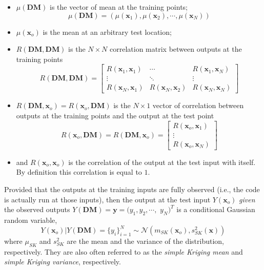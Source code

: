 \begin{itemize}
	\item $\mu(\mathbf{DM})$ is the vector of mean at the training points;
		\begin{equation}
			\mu(\mathbf{DM}) = (\mu(\mathbf{x}_1), \mu(\mathbf{x}_2), \cdots, \mu(\mathbf{x}_N)) 
		\label{eq:training_mean_vector}
		\end{equation}
	\item $\mu(\mathbf{x}_o)$ is the mean at an arbitrary test location;
	\item $R(\mathbf{DM}, \mathbf{DM})$ is the $N \times N$ correlation matrix between outputs at the training points
		\begin{equation}
			R(\mathbf{DM}, \mathbf{DM}) = 
				\begin{bmatrix}
					R(\mathbf{x}_1, \mathbf{x}_1) & \cdots												& R(\mathbf{x}_1, \mathbf{x}_N) \\
					\vdots												& \ddots												&	\vdots \\
					R(\mathbf{x}_N, \mathbf{x}_1)	&	R(\mathbf{x}_N, \mathbf{x}_2) & R(\mathbf{x}_N, \mathbf{x}_N)
				\end{bmatrix}
		\label{eq:training_correlation_matrix}
		\end{equation}
	\item $R(\mathbf{DM}, \mathbf{x}_o) = R(\mathbf{x}_o, \mathbf{DM})$ is the $N \times 1$ vector of correlation between outputs at the training points and the output at the test point
			\begin{equation}
				R(\mathbf{x}_o, \mathbf{DM}) = R(\mathbf{DM}, \mathbf{x}_o) =  
					\begin{bmatrix}
						R(\mathbf{x}_o, \mathbf{x}_1) \\
						\vdots												\\
						R(\mathbf{x}_o, \mathbf{x}_N)	
					\end{bmatrix}
			\label{eq:training_test_correlation}
			\end{equation}
		\item and $R(\mathbf{x}_o, \mathbf{x}_o)$ is the correlation of the output at the test input with itself. By definition this correlation is equal to $1$.
\end{itemize}

Provided that the outputs at the training inputs are fully observed (i.e., the code is actually run at those inputs),
then the output at the test input $Y(\mathbf{x}_o)$ \emph{given	} the observed outputs $Y(\mathbf{DM}) = \mathbf{y} = (y_1, y_2, \cdots,$ 
$y_N)^T$ is a conditional Gaussian random variable,
\begin{equation}
	Y(\mathbf{x}_o) | Y(\mathbf{DM}) = \{y_i\}_{i=1}^N \sim \mathcal{N} \left( m_{SK}(\mathbf{x}_o), s^2_{SK}(\mathbf{x})\right)
\label{eq:joint_training_test}
\end{equation}
where $\mu_{SK}$ and $s^2_{SK}$ are the mean and the variance of the distribution, respectively.
They are also often referred to as the \emph{simple Kriging mean} and \emph{simple Kriging variance}, respectively.

